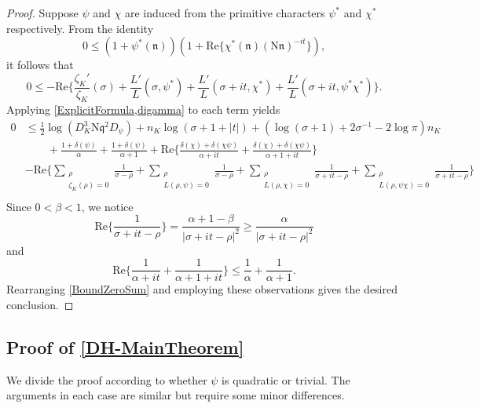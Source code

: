 \documentclass[12pt,psamsfonts]{amsart}
\theoremstyle{definition}
\theoremstyle{remark}
\numberwithin{equation}{section}
\theoremstyle{plain}
\theoremstyle{remark}
\renewcommand{\1}{ {\bf 1}}
\newcommand{\kn}{\mathfrak{n}}
\newcommand{\N}{\mathrm{N}}
\newcommand{\kq}{\mathfrak{q}}
\renewcommand{\Re}{\mathrm{Re}}
\begin{document}
\begin{proof}
Suppose $\psi$ and $\chi$ are induced from the primitive characters $\psi^*$ and $\chi^*$ respectively. From the identity
\[
0 \leq ( 1 + \psi^*(\kn) )(1 + \Re\{ \chi^*(\kn) (\N\kn)^{-it} \} ),
\]
it follows that 
\[
0 \leq - \Re\Big\{ \frac{\zeta_K'}{\zeta_K}(\sigma) +  \frac{L'}{L}(\sigma, \psi^*) + \frac{L'}{L}(\sigma+it, \chi^*) + \frac{L'}{L}(\sigma+it, \psi^*\chi^*)  \Big\}.
\]
Applying \cref{ExplicitFormula,digamma} to each term yields
\begin{equation}
\begin{aligned}
0 & \leq \tfrac{1}{2}\log(D_K^3 \N\kq^2 D_{\psi} ) +  n_K \log(\sigma+1+|t|) + (\log(\sigma+1) + 2\sigma^{-1} - 2\log \pi) n_K \\
& \qquad + \frac{1+\delta(\psi)}{\alpha} + \frac{1+\delta(\psi)}{\alpha+1} + \Re\Big\{ \frac{\delta(\chi) + \delta(\chi \psi) }{\alpha+it} + \frac{\delta(\chi) + \delta(\chi \psi)}{\alpha+1+it} \Big\}  \\
&  - \Re\Big\{ \sum_{\substack{\rho \\  \zeta_K(\rho) = 0}} \frac{1}{\sigma-\rho}  + \sum_{\substack{\rho \\  L(\rho, \psi) = 0}}  \frac{1}{\sigma -\rho}    + \sum_{\substack{\rho \\  L(\rho, \chi) = 0}}  \frac{1}{\sigma + it -\rho}  + \sum_{\substack{\rho \\  L(\rho, \psi\chi) = 0}}  \frac{1}{\sigma +it -\rho} \Big\}\\
\end{aligned}
\label{BoundZeroSum}
\end{equation}
Since $0 < \beta < 1$, we notice
\[
\Re\Big\{ \frac{1}{\sigma+it-\rho} \Big\} = \frac{\alpha+1-\beta}{|\sigma+it-\rho|^2} \geq \frac{\alpha}{|\sigma+it-\rho|^2} 
\]
and
\[
 \Re\Big\{ \frac{1}{\alpha+it} + \frac{1}{\alpha+1+it} \Big\}  \leq  \frac{1}{\alpha} + \frac{1}{\alpha+1}. 
\]
Rearranging \eqref{BoundZeroSum} and employing these observations gives the desired conclusion. 
\end{proof}

\subsection{Proof of \cref{DH-MainTheorem}}

We divide the proof according to whether $\psi$ is quadratic or trivial. The arguments in each case are similar but require some minor differences. 
\end{document}
